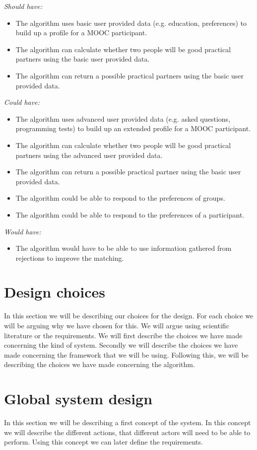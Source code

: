 \documentclass[]{article}
\newcommand{\reqr}[1]{{\noindent\emph{#1:}}}
\begin{document}
\reqr{Should have}
\begin{itemize}
\item The algorithm uses basic user provided data (e.g. education, preferences) to build up a profile for a MOOC participant.
\item The algorithm can calculate whether two people will be good practical partners using the basic user provided data.
\item The algorithm can return a possible practical partners using the basic user provided data.
\end{itemize}

\reqr{Could have}
\begin{itemize}
\item The algorithm uses advanced user provided data (e.g. asked questions, programming tests) to build up an extended profile for a MOOC participant.
\item The algorithm can calculate whether two people will be good practical partners using the advanced user provided data.
\item The algorithm can return a possible practical partner using the basic user provided data.
\item The algorithm could be able to respond to the preferences of groups.
\item The algorithm could be able to respond to the preferences of a participant.
\end{itemize}

\reqr{Would have}
\begin{itemize}
\item The algorithm would have to be able to use information gathered from rejections to improve the matching.
\end{itemize}

\section{Design choices}
In this section we will be describing our choices for the design.
For each choice we will be arguing why we have chosen for this.
We will argue using scientific literature or the requirements.
We will first describe the choices we have made concerning the kind of system.
Secondly we will describe the choices we have made concerning the framework that we will be using.
Following this, we will be describing the choices we have made concerning the algorithm.

\section{Global system design}
In this section we will be describing a first concept of the system.
In this concept we will describe the different actions, that different actors will need to be able to perform.
Using this concept we can later define the requirements.\\
\end{document}
